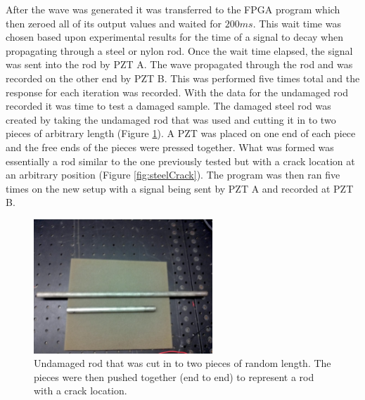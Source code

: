 After the wave was generated it was transferred to the FPGA program which then zeroed all of its output values and waited for $200ms$. This wait time was chosen based upon experimental results for the time of a signal to decay when propagating through a steel or nylon rod. Once the wait time elapsed, the signal was sent into the rod by PZT A. The wave propagated through the rod and was recorded on the other end by PZT B. This was performed five times total and the response for each iteration was recorded. With the data for the undamaged rod recorded it was time to test a damaged sample. The damaged steel rod was created  by taking the undamaged rod that was used and cutting it in to two pieces of arbitrary length (Figure \ref{fig:steelPieces}). A PZT was placed on one end of each piece and the free ends of the pieces were pressed together. What was formed was essentially a rod similar to the one previously tested but with a crack location at an arbitrary position (Figure \ref{fig:steelCrack}). The program was then ran five times on the new setup with a signal being sent by PZT A and recorded at PZT B.

\begin{figure}[ht!]
\centering
\includegraphics[width=0.6\textwidth]{eps_pics/steelPieces}
\caption{Undamaged rod that was cut in to two pieces of random length. The pieces were then pushed together (end to end) to represent a rod with a crack location.
 	 \label{fig:steelPieces}} 
\end{figure}

